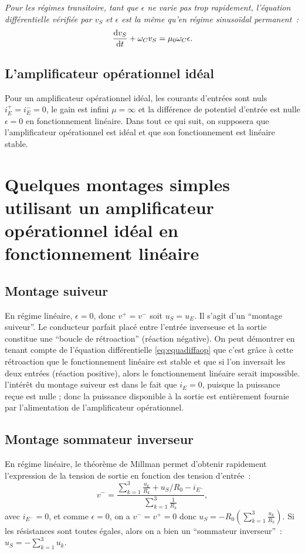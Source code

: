 \emph{Pour les régimes transitoire, tant que \(\epsilon\) ne varie pas trop rapidement, l'équation différentielle vérifiée par \(v_S\) et \(\epsilon\) est la même qu'en régime sinusoïdal permanent~:}
\begin{equation}
	\label{eq:equadiffaop}
	\dfrac{\mathrm{d} v_S}{\mathrm{d} t} + \omega_C v_S = \mu_0 \omega_C \epsilon.
\end{equation}

\subsection{L'amplificateur opérationnel idéal}
Pour un amplificateur opérationnel idéal, les courants d'entrées sont nuls \(i_E^+ = i_E^-=0\), le gain est infini \(\mu = \infty\) et la différence de potentiel d'entrée est nulle \(\epsilon=0\) en fonctionnement linéaire. %
Dans tout ce qui suit, on supposera que l'amplificateur opérationnel est idéal et que son fonctionnement est linéaire stable.

\section{Quelques montages simples utilisant un amplificateur opérationnel idéal en fonctionnement linéaire}
\subsection{Montage suiveur}
En régime linéaire, \(\epsilon=0\), donc \(v^+ = v^-\) soit \(u_S = u_E\). Il s'agit d'un ``montage suiveur''. Le conducteur parfait placé entre l'entrée inverseuse et la sortie constitue une ``boucle de rétroaction'' (réaction négative). On peut démontrer en tenant compte de l'équation différentielle \eqref{eq:equadiffaop} que c'est grâce à cette rétroaction que le fonctionnement linéaire est stable et que si l'on inversait les deux entrées (réaction positive), alors le fonctionnement linéaire serait impossible. l'intérêt du montage suiveur est dans le fait que \(i_E=0\), puisque la puissance reçue est nulle ; donc la puissance disponible à la sortie est entièrement fournie par l'alimentation de l'amplificateur opérationnel.
\subsection{Montage sommateur inverseur}
En régime linéaire, le théorème de Millman permet d'obtenir rapidement l'expression de la tension de sortie en fonction des tension d'entrée~:
\begin{equation}
	v^- = \frac{\sum_{k=1}^3 \frac{u_k}{R_k} + u_S/R_0 - i_{E^-}}{\sum_{k=1}^3 \frac{1}{R_k}},
\end{equation}
avec \(i_{E^-}=0\), et comme \(\epsilon=0\), on a \(v^-=v^+=0\) donc \(u_S = -R_0 \left(\sum_{k=1}^3 \frac{u_k}{R_k} \right)\). Si les résistances sont toutes égales, alors on a bien un ``sommateur inverseur''~:\(u_S = - \sum_{k=1}^3 u_k\).
